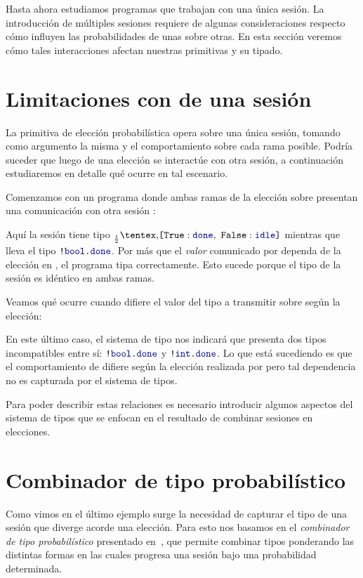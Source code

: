 Hasta ahora estudiamos programas que trabajan con una única sesión. La
introducción de múltiples sesiones requiere de algunas consideraciones respecto
cómo influyen las probabilidades de unas sobre otras. En esta sección veremos
cómo tales interacciones afectan nuestras primitivas y su tipado.

\section{Limitaciones con  de una sesión}

La primitiva de elección probabilística  opera sobre una única sesión,
tomando como argumento la misma y el comportamiento sobre cada rama posible.
Podría suceder que luego de una elección se interactúe con otra sesión, a
continuación estudiaremos en detalle qué ocurre en tal escenario.

Comenzamos con un programa donde ambas ramas de la elección sobre 
presentan una comunicación con otra sesión :

\TwoSessionsPickBothBranches

Aquí la sesión  tiene tipo $\BinaryPChoice[\frac{1}{2}]{\Done}{\Idle}$
mientras que  lleva el tipo $\Out\tbool\Done$. Por más que el \emph{valor}
comunicado por  dependa de la elección en , el programa tipa
correctamente. Esto sucede porque el tipo de la sesión es idéntico en ambas
ramas.

Veamos qué ocurre cuando difiere el valor del tipo a transmitir sobre 
según la elección:

\TwoSessionsInvalidPickBothBranches

En este último caso, el sistema de tipo nos indicará que  presenta dos
tipos incompatibles entre sí: $\Out\tbool\Done$ y $\Out\tint\Done$. Lo que está
sucediendo es que el comportamiento de  difiere según la elección
realizada por  pero tal dependencia no es capturada por el sistema de
tipos.

Para poder describir estas relaciones es necesario introducir algunos aspectos
del sistema de tipos que se enfocan en el resultado de combinar sesiones en
elecciones.

\section{Combinador de tipo probabilístico}

Como vimos en el último ejemplo surge la necesidad de capturar el tipo de una
sesión que diverge acorde una elección. Para esto nos basamos en el
\emph{combinador de tipo probabilístico} presentado
en~\cite{DBLP:conf/concur/InversoMPTT20}, que permite combinar tipos ponderando
las distintas formas en las cuales progresa una sesión bajo una probabilidad
determinada.

